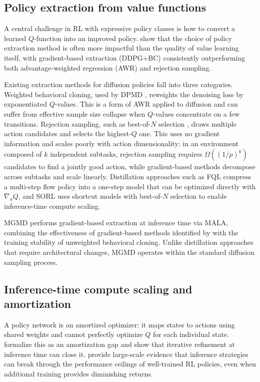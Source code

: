 \documentclass{article}
\theoremstyle{plain}
\theoremstyle{definition}
\theoremstyle{remark}
\begin{document}
\subsection{Policy extraction from value functions}

A central challenge in RL with expressive policy classes is how to convert a learned $Q$-function into an improved policy.
\citet{park2024bottleneck} show that the choice of policy extraction method is often more impactful than the quality of value learning itself, with gradient-based extraction (DDPG+BC) consistently outperforming both advantage-weighted regression (AWR) and rejection sampling.

Existing extraction methods for diffusion policies fall into three categories.
Weighted behavioral cloning, used by DPMD \citep{ma2025soft}, reweights the denoising loss by exponentiated $Q$-values. This is a form of AWR applied to diffusion and can suffer from effective sample size collapse when $Q$-values concentrate on a few transitions.
Rejection sampling, such as best-of-$N$ selection \citep{ma2025soft,espinosa2025evor}, draws multiple action candidates and selects the highest-$Q$ one. This uses no gradient information and scales poorly with action dimensionality: in an environment composed of $k$ independent subtasks, rejection sampling requires $\Omega((1/p)^k)$ candidates to find a jointly good action, while gradient-based methods decompose across subtasks and scale linearly.
Distillation approaches such as FQL \citep{park2025fql} compress a multi-step flow policy into a one-step model that can be optimized directly with $\nabla_a Q$, and SORL \citep{espinosa2025sorl} uses shortcut models with best-of-$N$ selection to enable inference-time compute scaling.

MGMD performs gradient-based extraction at inference time via MALA, combining the effectiveness of gradient-based methods identified by \citet{park2024bottleneck} with the training stability of unweighted behavioral cloning. Unlike distillation approaches that require architectural changes, MGMD operates within the standard diffusion sampling process.

\subsection{Inference-time compute scaling and amortization}

A policy network is an amortized optimizer: it maps states to actions using shared weights and cannot perfectly optimize $Q$ for each individual state. \citet{marino2021iterative} formalize this as an amortization gap and show that iterative refinement at inference time can close it. \citet{chalumeau2025breaking} provide large-scale evidence that inference strategies can break through the performance ceilings of well-trained RL policies, even when additional training provides diminishing returns.
\end{document}
